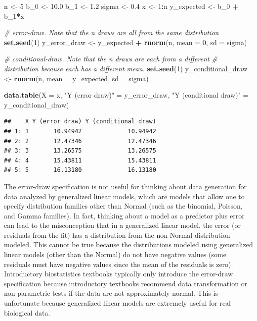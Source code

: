 \documentclass[]{book}
\newenvironment{Shaded}{\begin{snugshade}}{\end{snugshade}}
\newcommand{\CommentTok}[1]{\textcolor[rgb]{0.56,0.35,0.01}{\textit{#1}}}
\newcommand{\DataTypeTok}[1]{\textcolor[rgb]{0.13,0.29,0.53}{#1}}
\newcommand{\DecValTok}[1]{\textcolor[rgb]{0.00,0.00,0.81}{#1}}
\newcommand{\FloatTok}[1]{\textcolor[rgb]{0.00,0.00,0.81}{#1}}
\newcommand{\KeywordTok}[1]{\textcolor[rgb]{0.13,0.29,0.53}{\textbf{#1}}}
\newcommand{\NormalTok}[1]{#1}
\newcommand{\OperatorTok}[1]{\textcolor[rgb]{0.81,0.36,0.00}{\textbf{#1}}}
\newcommand{\StringTok}[1]{\textcolor[rgb]{0.31,0.60,0.02}{#1}}
\begin{document}
\begin{Shaded}
\begin{Highlighting}[]
\NormalTok{n <-}\StringTok{ }\DecValTok{5}
\NormalTok{b_}\DecValTok{0}\NormalTok{ <-}\StringTok{ }\FloatTok{10.0}
\NormalTok{b_}\DecValTok{1}\NormalTok{ <-}\StringTok{ }\FloatTok{1.2}
\NormalTok{sigma <-}\StringTok{ }\FloatTok{0.4}
\NormalTok{x <-}\StringTok{ }\DecValTok{1}\OperatorTok{:}\NormalTok{n}
\NormalTok{y_expected <-}\StringTok{ }\NormalTok{b_}\DecValTok{0} \OperatorTok{+}\StringTok{ }\NormalTok{b_}\DecValTok{1}\OperatorTok{*}\NormalTok{x}

\CommentTok{# error-draw. Note that the n draws are all from the same distribution}
\KeywordTok{set.seed}\NormalTok{(}\DecValTok{1}\NormalTok{)}
\NormalTok{y_error_draw <-}\StringTok{ }\NormalTok{y_expected }\OperatorTok{+}\StringTok{ }\KeywordTok{rnorm}\NormalTok{(n, }\DataTypeTok{mean =} \DecValTok{0}\NormalTok{, }\DataTypeTok{sd =}\NormalTok{ sigma)}

\CommentTok{# conditional-draw. Note that the n draws are each from a different}
\CommentTok{# distribution because each has a different mean.}
\KeywordTok{set.seed}\NormalTok{(}\DecValTok{1}\NormalTok{)}
\NormalTok{y_conditional_draw <-}\StringTok{ }\KeywordTok{rnorm}\NormalTok{(n, }\DataTypeTok{mean =}\NormalTok{ y_expected, }\DataTypeTok{sd =}\NormalTok{ sigma)}

\KeywordTok{data.table}\NormalTok{(}\DataTypeTok{X =}\NormalTok{ x,}
           \StringTok{"Y (error draw)"}\NormalTok{ =}\StringTok{ }\NormalTok{y_error_draw,}
           \StringTok{"Y (conditional draw)"}\NormalTok{ =}\StringTok{ }\NormalTok{y_conditional_draw)}
\end{Highlighting}
\end{Shaded}

\begin{verbatim}
##    X Y (error draw) Y (conditional draw)
## 1: 1       10.94942             10.94942
## 2: 2       12.47346             12.47346
## 3: 3       13.26575             13.26575
## 4: 4       15.43811             15.43811
## 5: 5       16.13180             16.13180
\end{verbatim}

The error-draw specification is not useful for thinking about data generation for data analyzed by generalized linear models, which are models that allow one to specify distribution families other than Normal (such as the binomial, Poisson, and Gamma families). In fact, thinking about a model as a predictor plus error can lead to the misconception that in a generalized linear model, the error (or residuals from the fit) has a distribution from the non-Normal distribution modeled. This cannot be true because the distributions modeled using generalized linear models (other than the Normal) do not have negative values (some residuals must have negative values since the mean of the residuals is zero). Introductory biostatistics textbooks typically only introduce the error-draw specification because introductory textbooks recommend data transformation or non-parametric tests if the data are not approximately normal. This is unfortunate because generalized linear models are extremely useful for real biological data.
\end{document}
